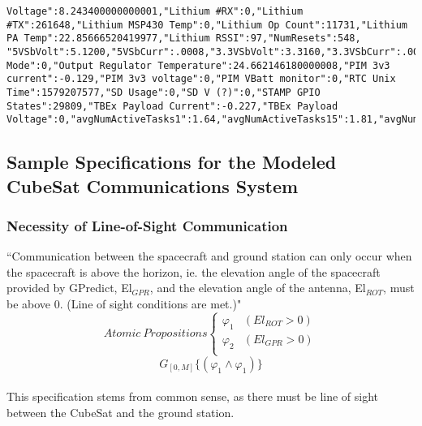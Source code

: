 \begin{lstlisting}
Voltage":8.243400000000001,"Lithium #RX":0,"Lithium #TX":261648,"Lithium MSP430 Temp":0,"Lithium Op Count":11731,"Lithium PA Temp":22.85666520419977,"Lithium RSSI":97,"NumResets":548, "5VSbVolt":5.1200,"5VSbCurr":.0008,"3.3VSbVolt":3.3160,"3.3VSbCurr":.0005,"1.5VSbVolt"1.4930,"1.5VSbCurr":.0004,"Operation Mode":0,"Output Regulator Temperature":24.662146180000008,"PIM 3v3 current":-0.129,"PIM 3v3 voltage":0,"PIM VBatt monitor":0,"RTC Unix Time":1579207577,"SD Usage":0,"SD V (?)":0,"STAMP GPIO States":29809,"TBEx Payload Current":-0.227,"TBEx Payload Voltage":0,"avgNumActiveTasks1":1.64,"avgNumActiveTasks15":1.81,"avgNumActiveTasks5":1.82,"data_checksum_passed":true,"flag":3,"freeMemPlusCache":107632,"header_checksum_passed":true,"pid":0,"sid":83,"telemetry_archive":false,"telemetry_archive_file_num":0,"totNumProcesses":41,"usedMemMinusCache":19272}}
\end{lstlisting}

\subsection{Sample Specifications for the Modeled CubeSat Communications System}

\subsubsection{\textbf{Necessity of Line-of-Sight Communication}}
“Communication between the spacecraft and ground station can only occur when the spacecraft is above the horizon, ie. the elevation angle of the spacecraft provided by GPredict, El$_{GPR}$, and the elevation angle of the antenna, El$_{ROT}$, must be above 0. (Line of sight conditions are met.)"\\
\[ Atomic\:Propositions \begin{cases}
  \varphi_1 & (El_{ROT} > 0) \\
  \varphi_2 & (El_{GPR} > 0) \\
\end{cases} \]
\begin{equation}
    \label{Spec 1}
    G_{[0,M]} \{(\varphi_1 \wedge \varphi_1)\}
\end{equation} \\
This specification stems from common sense, as there must be line of sight between the CubeSat and the ground station.


